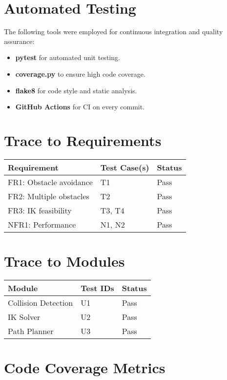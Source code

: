 \documentclass[12pt, titlepage]{article}
\begin{document}
\section{Automated Testing}

The following tools were employed for continuous integration and quality assurance:

\begin{itemize}
  \item \textbf{pytest} for automated unit testing.
  \item \textbf{coverage.py} to ensure high code coverage.
  \item \textbf{flake8} for code style and static analysis.
  \item \textbf{GitHub Actions} for CI on every commit.
\end{itemize}

\section{Trace to Requirements}

\begin{tabularx}{\textwidth}{l l l}
\toprule
\textbf{Requirement} & \textbf{Test Case(s)} & \textbf{Status} \\
\midrule
FR1: Obstacle avoidance & T1 & Pass \\
FR2: Multiple obstacles & T2 & Pass \\
FR3: IK feasibility & T3, T4 & Pass \\
NFR1: Performance & N1, N2 & Pass \\
\bottomrule
\end{tabularx}

\section{Trace to Modules}

\begin{tabularx}{\textwidth}{l l l}
\toprule
\textbf{Module} & \textbf{Test IDs} & \textbf{Status} \\
\midrule
Collision Detection & U1 & Pass \\
IK Solver & U2 & Pass \\
Path Planner & U3 & Pass \\
\bottomrule
\end{tabularx}

\section{Code Coverage Metrics}
\end{document}
